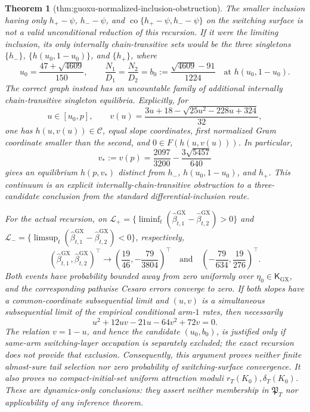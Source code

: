 \documentclass{article}
\newtheorem{theorem}{Theorem}
\begin{document}
\begin{theorem}[thm:guoxu-normalized-inclusion-obstruction]
The smaller inclusion having only \(h_+-\psi\), \(h_--\psi\), and \(\operatorname{co}\{h_+-\psi,h_--\psi\}\) on the switching surface is not a valid unconditional reduction of this recursion. If it were the limiting inclusion, its only internally chain-transitive sets would be the three singletons \(\{h_-\}\), \(\{h(u_0,1-u_0)\}\), and \(\{h_+\}\), where
\[
 u_0=\frac{47+\sqrt{4609}}{150},\qquad
 \frac{N_1}{D_1}=\frac{N_2}{D_2}
 =b_0:=\frac{\sqrt{4609}-91}{1224}
 \quad\text{at }h(u_0,1-u_0).
\]
The correct graph instead has an uncountable family of additional internally chain-transitive singleton equilibria. Explicitly, for
\[
 u\in[u_0,p],\qquad
 v(u)=\frac{3u+18-\sqrt{25u^2-228u+324}}{32},
\]
one has \(h(u,v(u))\in\mathcal C\), equal slope coordinates, first normalized Gram coordinate smaller than the second, and \(0\in F(h(u,v(u)))\). In particular,
\[
 v_*:=v(p)=\frac{2097}{3200}-\frac{3\sqrt{5457}}{640}
\]
gives an equilibrium \(h(p,v_*)\) distinct from \(h_-\), \(h(u_0,1-u_0)\), and \(h_+\). This continuum is an explicit internally-chain-transitive obstruction to a three-candidate conclusion from the standard differential-inclusion route.

For the actual recursion, on \(\mathcal L_+=\{\liminf_t(\widehat\beta^{\mathrm{GX}}_{t,1}-\widehat\beta^{\mathrm{GX}}_{t,2})>0\}\) and \(\mathcal L_-=\{\limsup_t(\widehat\beta^{\mathrm{GX}}_{t,1}-\widehat\beta^{\mathrm{GX}}_{t,2})<0\}\), respectively,
\[
 (\widehat\beta^{\mathrm{GX}}_{t,1},\widehat\beta^{\mathrm{GX}}_{t,2})^\top
 \longrightarrow
 \left(\frac{19}{46},-\frac{79}{3804}\right)^\top
 \quad\text{and}\quad
 \left(-\frac{79}{634},\frac{19}{276}\right)^\top.
\]
Both events have probability bounded away from zero uniformly over \(\eta_0\in\mathsf K_{\mathrm{GX}}\), and the corresponding pathwise Cesaro errors converge to zero. If both slopes have a common-coordinate subsequential limit and \((u,v)\) is a simultaneous subsequential limit of the empirical conditional arm-\(1\) rates, then necessarily
\[
 u^2+12uv-21u-64v^2+72v=0.
\]
The relation \(v=1-u\), and hence the candidate \((u_0,b_0)\), is justified only if same-arm switching-layer occupation is separately excluded; the exact recursion does not provide that exclusion. Consequently, this argument proves neither finite almost-sure tail selection nor zero probability of switching-surface convergence. It also proves no compact-initial-set uniform attraction moduli \(r_T(K_0),\delta_T(K_0)\). These are dynamics-only conclusions: they assert neither membership in \(\mathfrak P_T\) nor applicability of any inference theorem.
\end{theorem}
\end{document}
